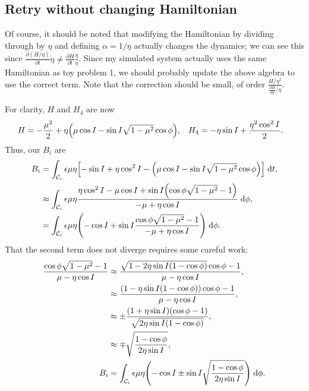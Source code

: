 \documentclass[11pt,
        usenames, %
        dvipsnames %
    ]{article}
\newcommand*{\pd}[2]{\frac{\partial#1}{\partial#2}}
\DeclarePairedDelimiter\p{\lparen}{\rparen}
\DeclarePairedDelimiter\s{\lbrack}{\rbrack}
\begin{document}
\subsection{Retry without changing Hamiltonian}

Of course, it should be noted that modifying the Hamiltonian by dividing through
by $\eta$ and defining $\alpha = 1/\eta$ actually changes the dynamics; we can
see this since $\pd{(H/\eta)}{t}\dot{\eta} \neq
\pd{H}{t}\frac{\dot{\eta}}{\eta}$. Since my simulated system actually uses the
same Hamiltonian as toy problem 1, we should probably update the above algebra
to use the correct term. Note that the correction should be small, of order
$\frac{H/\eta^2}{\pd{H}{\eta}/\eta}$.

For clarity, $H$ and $H_4$ are now
\begin{align*}
    H &= -\frac{\mu^2}{2}
            + \eta\p*{\mu \cos I - \sin I \sqrt{1 - \mu^2}\cos \phi}, &
    H_4 &= -\eta \sin I + \frac{\eta^2 \cos^2 I}{2}.
\end{align*}
Thus, our $B_i$ are
\begin{align*}
    B_i &= \int_{\mathcal{C}_i} \epsilon \mu \eta
            \s*{-\sin I + \eta \cos^2 I -
                \p*{\mu \cos I - \sin I \sqrt{1 - \mu^2}\cos \phi}}
            \;\mathrm{d}t,\\
        &\approx \int_{\mathcal{C}_i} \epsilon \mu \eta
            \frac{\eta \cos^2 I - \mu \cos I
                + \sin I\p*{\cos \phi \sqrt{1 - \mu^2} - 1}}{-\mu + \eta \cos I}
            \;\mathrm{d}\phi,\\
        &= \int_{\mathcal{C}_i} \epsilon \mu \eta
            \p*{-\cos I + \sin I \frac{\cos \phi \sqrt{1 - \mu^2} - 1}{-\mu +
            \eta \cos I}} \;\mathrm{d}\phi.
\end{align*}
That the second term does not diverge requires some careful work:
\begin{align*}
    \frac{\cos \phi\sqrt{1 - \mu^2} - 1}{\mu - \eta \cos I}
        &\approx \frac{\sqrt{1 - 2\eta \sin I\p*{1 - \cos \phi}}\cos \phi
            - 1}{\mu - \eta \cos I},\\
        &\approx \frac{(1 - \eta \sin I(1 - \cos \phi))\cos \phi - 1}{
            \mu - \eta \cos I},\\
        &\approx \pm\frac{(1 + \eta \sin I)(\cos \phi - 1)}{\sqrt{2\eta \sin I
            (1 - \cos \phi)}},\\
        &\approx \mp\sqrt{\frac{1 - \cos \phi}{2\eta \sin I}},\\
    B_i &= \int_{\mathcal{C}_i} \epsilon \mu \eta
            \p*{-\cos I \pm \sin I
                \sqrt{\frac{1 - \cos \phi}{2\eta \sin I}}} \;\mathrm{d}\phi.
\end{align*}
\end{document}
